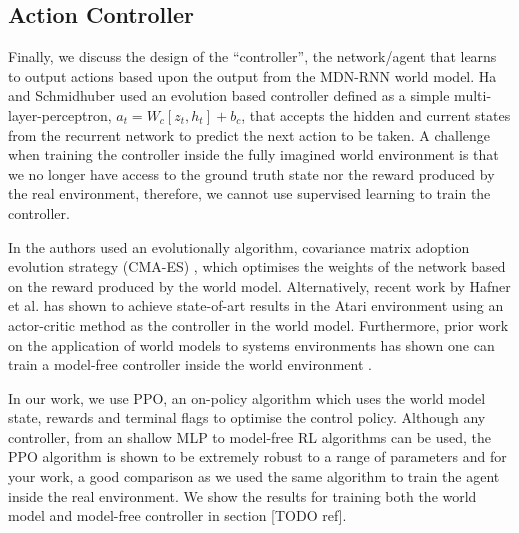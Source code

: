 \subsection{Action Controller}

Finally, we discuss the design of the ``controller'', the network/agent that learns to output actions based upon the output from the MDN-RNN world model. Ha and Schmidhuber \cite{ha2018worldmodels} used an evolution based controller defined as a simple multi-layer-perceptron, $a_t = W_c[z_t, h_t] + b_c$, that accepts the hidden and current states from the recurrent network to predict the next action to be taken. A challenge when training the controller inside the fully imagined world environment is that we no longer have access to the ground truth state nor the reward produced by the real environment, therefore, we cannot use supervised learning to train the controller. 

In \cite{ha2018worldmodels} the authors used an evolutionally algorithm, covariance matrix adoption evolution strategy (CMA-ES) \cite{hansen2001completely, hansen2016cma}, which optimises the weights of the network based on the reward produced by the world model. Alternatively, recent work by Hafner et al. \cite{hafner2020dream, hafner2021mastering} has shown to achieve state-of-art results in the Atari environment using an actor-critic method as the controller in the world model. Furthermore, prior work on the application of world models to systems environments has shown one can train a model-free controller inside the world environment \cite{app10196685}.


In our work, we use PPO, an on-policy algorithm which uses the world model state, rewards and terminal flags to optimise the control policy. Although any controller, from an shallow MLP to model-free RL algorithms can be used, the PPO algorithm is shown to be extremely robust to a range of parameters and for your work, a good comparison as we used the same algorithm to train the agent inside the real environment. We show the results for training both the world model and model-free controller in section [TODO ref].